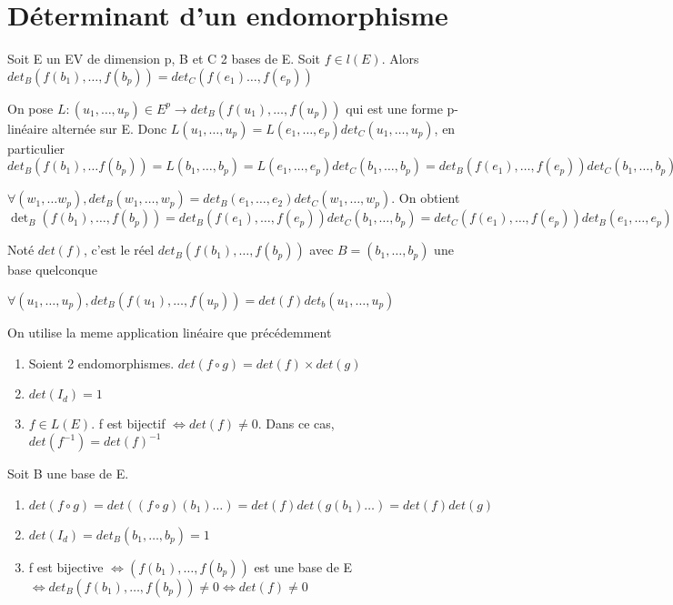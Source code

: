 \documentclass[french]{yLectureNote}
\begin{document}
\section{Déterminant d'un endomorphisme}
\begin{theorem}[]
 Soit E un EV de dimension p, B et C 2 bases de E. Soit \(f\in l(E)\). Alors \(det_B(f(b_1),\dots, f(b_p)) = det_C(f(e_1)\dots, f(e_p))\)
\end{theorem}
\begin{myproof}
 On pose \(L:(u_1,\dots, u_p)\in E^p \to det_B(f(u_1),\dots, f(u_p))\) qui est une forme p-linéaire alternée sur E. Donc \(L(u_1,\dots, u_p) = L(e_1,\dots, e_p)det_C(u_1,\dots, u_p)\), en particulier \(det_B(f(b_1),\dots f(b_p)) = L(b_1,\dots, b_p) = L(e_1,\dots, e_p)det_C(b_1,\dots, b_p) = det_B(f(e_1),\dots, f(e_p))det_C(b_1,\dots, b_p)\)

 \(\forall (w_1,\dots w_p), det_B(w_1,\dots, w_p) = det_B(e_1,\dots, e_2)det_C(w_1,\dots, w_p)\). On obtient \(\det_B(f(b_1),\dots, f(b_p)) = det_B(f(e_1),\dots, f(e_p))det_C(b_1,\dots, b_p) = det_C(f(e_1),\dots, f(e_p))det_B(e_1,\dots, e_p)det_C(b_1,\dots, b_p) = det_C(f(e_1),\dots, f(e_p))\)
\end{myproof}
\begin{definition}
Noté \(det(f)\), c'est le réel \(det_B(f(b_1),\dots, f(b_p))\) avec \(B = (b_1,\dots, b_p)\) une base quelconque
\end{definition}
\begin{proposition}
\(\forall (u_1,\dots, u_p), det_B(f(u_1), \dots, f(u_p)) = det(f)det_b(u_1,\dots, u_p)\)
\end{proposition}
\begin{myproof}
 On utilise la meme application linéaire que précédemment
\end{myproof}
\begin{proposition}
\begin{enumerate}
 \item Soient 2 endomorphismes. \(det(f\circ g) = det(f)\times det(g)\)
 \item \(det(I_d) = 1\)
 \item \(f\in L(E).\) f est bijectif \(\iff det(f)\neq 0\). Dans ce cas, \(det(f^{-1})=det(f)^{-1}\)
\end{enumerate}
\end{proposition}
\begin{myproof}
 Soit B une base de E.
 \begin{enumerate}
  \item \(det(f\circ g)= det((f\circ g)(b_1)\dots) = det(f)det(g(b_1)\dots) = det(f)det(g)\)
  \item \(det(I_d) = det_B(b_1,\dots, b_p) = 1\)
  \item f est bijective \(\iff (f(b_1),\dots, f(b_p))\) est une base de E \(\iff det_B(f(b_1),\dots, f(b_p))\neq 0 \iff det(f)\neq 0\)
 \end{enumerate}
\end{myproof}
\end{document}
